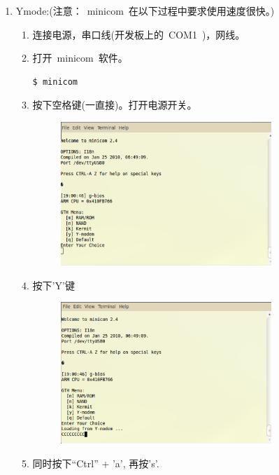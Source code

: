 \documentclass[a4paper,11pt]{book}
\begin{document}
\begin{enumerate} \setlength{\itemsep}{-\itemsep}
\item Ymode:(注意：~minicom~在以下过程中要求使用速度很快。)
	\begin{enumerate} \setlength{\itemsep}{-\itemsep}
	\item 连接电源，串口线(开发板上的~COM1~)，网线。
	\item 打开~minicom~软件。
	\begin{lstlisting}[language=c,numbers=none]
	$ minicom
	\end{lstlisting}
	\item 按下空格键(一直接)。打开电源开关。
	\begin{figure}[H]
	\centering
	\includegraphics[width=0.8\textwidth]{image/min_01.eps}
	\end{figure}
	\item 按下'Y'键
		\begin{figure}[H]
		\centering
		\includegraphics[width=0.8\textwidth]{image/min_02.eps}
		\end{figure}
	\item 同时按下``Ctrl'' + 'a', 再按's'.
		\begin{figure}[H]

\end{figure}
\end{enumerate}
\end{enumerate}
\end{document}
